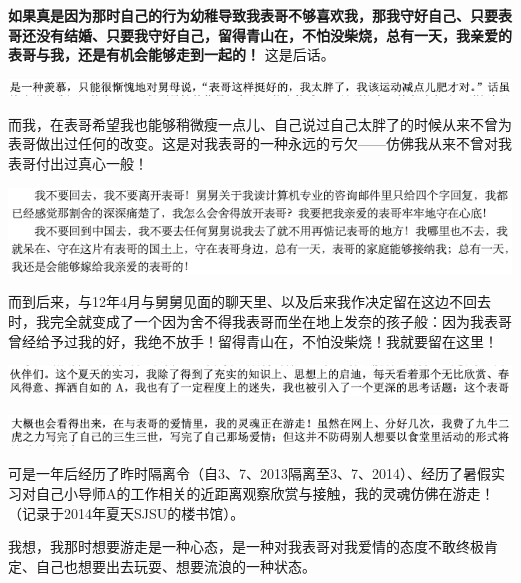 \documentclass[9pt, b5paper]{article}
\begin{document}
\textbf{如果真是因为那时自己的行为幼稚导致我表哥不够喜欢我，那我守好自己、只要表哥还没有结婚、只要我守好自己，留得青山在，不怕没柴烧，总有一天，我亲爱的表哥与我，还是有机会能够走到一起的！} 这是后话。

\begin{center}
\includegraphics[width=.9\linewidth]{./pic/backups_plans_20210426_163905.png}
\end{center}

而我，在表哥希望我也能够稍微瘦一点儿、自己说过自己太胖了的时候从来不曾为表哥做出过任何的改变。这是对我表哥的一种永远的亏欠——仿佛我从来不曾对我表哥付出过真心一般！

\begin{center}
\includegraphics[width=.9\linewidth]{./pic/backups_plans_20210426_164137.png}
\end{center}

而到后来，与12年4月与舅舅见面的聊天里、以及后来我作决定留在这边不回去时，我完全就变成了一个因为舍不得我表哥而坐在地上发奈的孩子般：因为我表哥曾经给予过我的好，我绝不放手！留得青山在，不怕没柴烧！我就要留在这里！

\begin{center}
\includegraphics[width=.9\linewidth]{./pic/backups_plans_20210426_113411.png}
\end{center}

\begin{center}
\includegraphics[width=.9\linewidth]{./pic/backups_plans_20210426_113704.png}
\end{center}

可是一年后经历了昨时隔离令（自3、7、2013隔离至3、7、2014）、经历了暑假实习对自己小导师A的工作相关的近距离观察欣赏与接触，我的灵魂仿佛在游走！（记录于2014年夏天SJSU的楼书馆）。

我想，我那时想要游走是一种心态，是一种对我表哥对我爱情的态度不敢终极肯定、自己也想要出去玩耍、想要流浪的一种状态。
\end{document}
